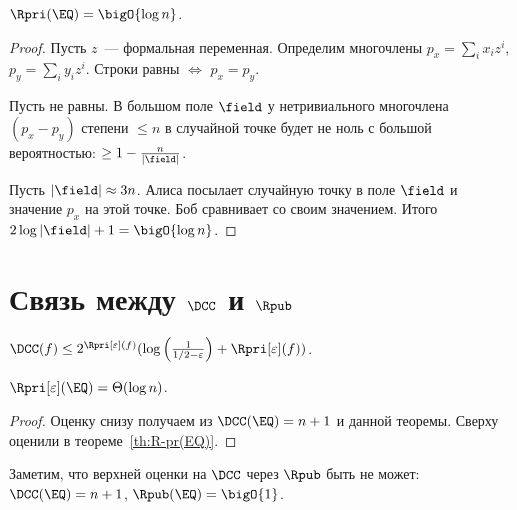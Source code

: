 \begin{theorem}
    \label{th:R-pr(EQ)}
    $\Rpri(\EQ) = \bigO{\log n}$.
\end{theorem}

\begin{proof}
    Пусть $z$~--- формальная переменная. Определим многочлены $p_x = \sum\limits_i x_i z^i$, $p_y =
    \sum\limits_i y_i z^i$. Строки равны $\iff$ $p_x = p_y$.

    Пусть не равны. В большом поле $\field$ у нетривиального многочлена $(p_x - p_y)$ степени $\le n$ в
    случайной точке будет не ноль с большой вероятностью: $\ge 1 - \frac{n}{|\field|}$.

    Пусть $|\field| \approx 3n$. Алиса посылает случайную точку в поле $\field$ и значение $p_x$ на этой
    точке. Боб сравнивает со своим значением. Итого $2 \log |\field| + 1 = \bigO{\log n}$.
\end{proof}

\section{Связь между \texorpdfstring{$\DCC$}{D} и \texorpdfstring{$\Rpub$}{R[pub]}}

\begin{theorem}
    \label{th:pri-to-det}%
    $\DCC(f) \le 2^{\Rpri[\varepsilon](f)} (\log\left(\frac{1}{1/2 - \varepsilon}\right) +
    \Rpri[\varepsilon](f))$.
\end{theorem}

\begin{corollary}
    $\Rpri[\varepsilon](\EQ) = \Theta(\log n)$.
\end{corollary}

\begin{proof}
    Оценку снизу получаем из $\DCC(\EQ) = n + 1$ и данной теоремы. Сверху оценили в теореме~\ref{th:R-pr(EQ)}.
\end{proof}

Заметим, что верхней оценки на $\DCC$ через $\Rpub$ быть не может: $\DCC(\EQ) = n + 1$, $\Rpub(\EQ) = \bigO{1}$.

